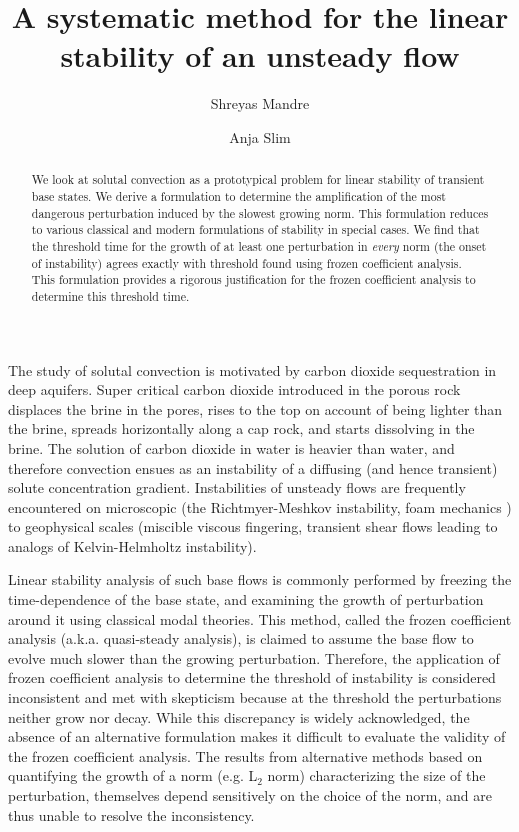 \documentclass[letterpaper,10pt,prl,twocolumn,aps,reprint,superscriptaddress]{revtex4-1}
\begin{document}
\title{A systematic method for the linear stability of an unsteady flow}
\author{Shreyas Mandre}
\author{Anja Slim}
\begin{abstract}
We look at solutal convection as a prototypical problem for linear stability of transient base states. 
We derive a formulation to determine the amplification of the most dangerous perturbation induced by the slowest growing norm. 
This formulation reduces to various classical and modern formulations of stability in special cases. 
We find that the threshold time for the growth of at least one perturbation in {\em every} norm (the onset of instability) agrees exactly with threshold found using frozen coefficient analysis. 
This formulation provides a rigorous justification for the frozen coefficient analysis to determine this threshold time.
\end{abstract}
\maketitle
The study of solutal convection is motivated by carbon dioxide sequestration in deep aquifers\cite{SlimRama10,RapakaChen08,RiazHesse06,EnnisKingPreston05,EnnisKingPaterson05}. 
Super critical carbon dioxide introduced in the porous rock displaces the brine in the pores, rises to the top on account of being lighter than the brine, spreads horizontally along a cap rock, and starts dissolving in the brine. 
The solution of carbon dioxide in water is heavier than water, and therefore convection ensues as an instability of a diffusing (and hence transient) solute concentration gradient. 
Instabilities of unsteady flows are frequently encountered on microscopic (the Richtmyer-Meshkov instability\cite{brouillette2002richtmyer}, foam mechanics \cite{anderson2010foam}) to geophysical scales (miscible viscous fingering\cite{homsy1987viscous}, transient shear flows leading to analogs of Kelvin-Helmholtz instability\cite{thorpe1968method}). 

Linear stability analysis of such base flows is commonly performed by freezing the time-dependence of the base state, and examining the growth of perturbation around it using classical modal theories. 
This method, called the frozen coefficient analysis (a.k.a. quasi-steady analysis), is claimed to assume the base flow to evolve much slower than the growing perturbation. 
Therefore, the application of frozen coefficient analysis to determine the threshold of instability is considered inconsistent and met with skepticism because at the threshold the perturbations neither grow nor decay. 
While this discrepancy is widely acknowledged, the absence of an alternative formulation makes it difficult to evaluate the validity of the frozen coefficient analysis. 
The results from alternative methods based on quantifying the growth of a norm (e.g. L$_2$ norm) characterizing the size of the perturbation\cite{SlimRama10}, themselves depend sensitively on the choice of the norm, and are thus unable to resolve the inconsistency.
\end{document}
